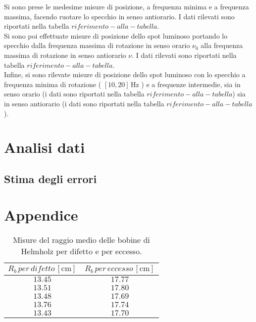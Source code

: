 \documentclass[]{article}
\let\oldsection\section%
\renewcommand{\section}{%
	\renewcommand{\theequation}{\thesection.\arabic{equation}}%
	\oldsection}%
\let\oldsubsection\subsection%
\renewcommand{\subsection}{%
	\renewcommand{\theequation}{\thesubsection.\arabic{equation}}%
	\oldsubsection}%
\begin{document}
    Si sono prese le medesime misure di posizione, a frequenza minima e a frequenza massima, facendo ruotare
    lo specchio in senso antiorario. I dati rilevati sono riportati nella tabella $ riferimento-alla-tabella $. \\ 

    Si sono poi effettuate misure di posizione dello spot luminoso portando lo specchio dalla frequenza massima di rotazione in senso
    orario $\nu_0$ alla frequenza massima di rotazione in senso antiorario $\nu$.
    I dati rilevati sono riportati nella tabella $ riferimento-alla-tabella $. \\

    Infine, si sono rilevate misure di posizione dello spot luminoso con lo specchio a frequenza minima di rotazione ( $[10,20] \, \text{Hz}$ )
    e a frequenze intermedie, sia in senso orario (i dati sono riportati nella tabella $ riferimento-alla-tabella $) sia 
    in senso antiorario (i dati sono riportati nella tabella $ riferimento-alla-tabella $). \\

    \section {Analisi dati}

    \subsection {Stima degli errori}

    \section{Appendice}

    \begin{table}
        \centering

    \begin{tabular}{||c|c||}
        \hline
        $R_b \, per \, difetto\, [\text{cm}] $ & $R_b \, per \, eccesso\, [\text{cm}] $\\
        \hline\hline

        $ 13.45 $ & $ 17.77 $ \\\hline
        $ 13.51 $ & $ 17.80 $ \\\hline
        $ 13.48 $ & $ 17.69 $ \\\hline
        $ 13.76 $ & $ 17.74 $ \\\hline
        $ 13.43 $ & $ 17.70 $ \\\hline
    
    \end{tabular}
    \caption{Misure del raggio medio delle bobine di Helmholz per difetto e per eccesso.}
    \label{Raggio_bobine}
\end{table}
\end{document}
